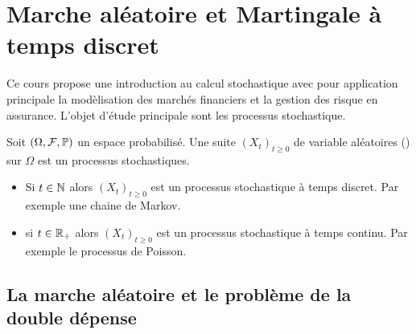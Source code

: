\chapter{Marche aléatoire et Martingale à temps discret}\label{chap:marche_aléatoire}
Ce cours propose une introduction au calcul stochastique avec pour application principale la modèlisation des marchés financiers et la gestion des risque en assurance. L'objet d'étude principale sont les processus stochastique. 
\begin{definition}\label{def:filtration}
Soit $(\Omega, \mathcal{F}, \mathbb{P})$ un espace probabilisé. Une suite $(X_t)_{t\geq0}$ de variable aléatoires (\va) sur $\Omega$ est un processus stochastiques.
  \begin{itemize}
    \item Si $t\in \mathbb{N}$ alors $(X_t)_{t\geq0}$ est un processus stochastique à temps discret. Par exemple une chaine de Markov. 
    \item si $t\in \mathbb{R}_+$ alors $(X_t)_{t\geq0}$ est un processus stochastique à temps continu. Par exemple le processus de Poisson. 
  \end{itemize}
\end{definition}
\section{La marche aléatoire et le problème de la double dépense}

